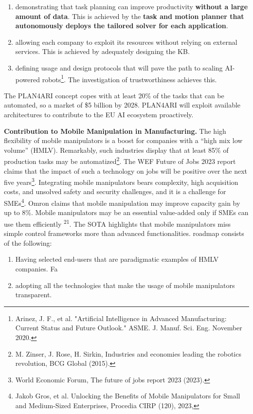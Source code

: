 \begin{enumerate}
\def\labelenumi{\arabic{enumi}.}
\item
  demonstrating that task planning can improve productivity
  \textbf{without a large amount of data}. This is achieved by the
  \textbf{task and motion planner that autonomously deploys the tailored
  solver for each application}.
\item
  allowing each company to exploit its resources without relying on
  external services. This is achieved by adequately designing the KB.
\item
  defining usage and design protocols that will pave the path to scaling
  AI-powered robots\footnote{Arinez, J. F., et al. "Artificial
    Intelligence in Advanced Manufacturing: Current Status and Future
    Outlook." ASME. J. Manuf. Sci. Eng. November 2020.}. The
  investigation of trustworthiness achieves this.
\end{enumerate}

The PLAN4ARI concept copes with at least 20\% of the tasks that can be
automated, so a market of \$5 billion by 2028. PLAN4ARI will exploit
available architectures to contribute to the EU AI ecosystem
proactively.

\textbf{Contribution to Mobile Manipulation in Manufacturing.} The high
flexibility of mobile manipulators is a boost for companies with a
``high mix low volume'' (HMLV). Remarkably, such industries display that
at least 85\% of production tasks may be automatized\footnote{M. Zinser,
  J. Rose, H. Sirkin, Industries and economies leading the robotics
  revolution, BCG Global (2015).}. The WEF Future of Jobs 2023 report
claims that the impact of such a technology on jobs will be positive
over the next five years\footnote{World Economic Forum, The future of
  jobs report 2023 (2023).}. Integrating mobile manipulators bears
complexity, high acquisition costs, and unsolved safety and security
challenges, and it is a challenge for SMEs\footnote{Jakob Gros, et al.
  Unlocking the Benefits of Mobile Manipulators for Small and
  Medium-Sized Enterprises, Procedia CIRP (120), 2023,}. Omron claims
that mobile manipulation may improve capacity gain by up to 8\%. Mobile
manipulators may be an essential value-added only if SMEs can use them
efficiently \textsuperscript{21}. The SOTA highlights that mobile
manipulators miss simple control frameworks more than advanced
functionalities.  roadmap consists of the following:

\begin{enumerate}
\def\labelenumi{\arabic{enumi}.}
\setcounter{enumi}{3}
\item
  Having selected end-users that are paradigmatic examples of HMLV
  companies. Fa
\item
  adopting all the technologies that make the usage of mobile
  manipulators transparent.
\end{enumerate}

